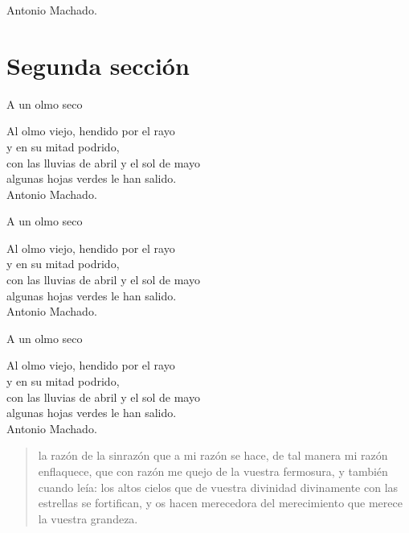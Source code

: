 \documentclass[a4paper,12pt]{article} %
\begin{document}
Antonio Machado.


\section{Segunda sección}


\begin{center}

A un olmo seco

Al olmo viejo, hendido por el rayo \\
y en su mitad podrido, \\
con las lluvias de abril y el sol de mayo \\
algunas hojas verdes le han salido. \\

Antonio Machado.

\end{center}

\begin{flushleft}

A un olmo seco

Al olmo viejo, hendido por el rayo \\
y en su mitad podrido, \\
con las lluvias de abril y el sol de mayo \\
algunas hojas verdes le han salido. \\

Antonio Machado.

\end{flushleft}

\begin{flushright}

A un olmo seco

Al olmo viejo, hendido por el rayo \\
y en su mitad podrido, \\
con las lluvias de abril y el sol de mayo \\
algunas hojas verdes le han salido. \\

Antonio Machado.

\end{flushright}

\begin{quote}
    la razón de la sinrazón que a mi razón se hace, de tal manera mi razón enflaquece, que con razón me quejo de la vuestra fermosura, y también cuando leía: los altos cielos que de vuestra divinidad divinamente con las estrellas se fortifican, y os hacen merecedora del merecimiento que merece la vuestra grandeza.
\end{quote}
\end{document}
